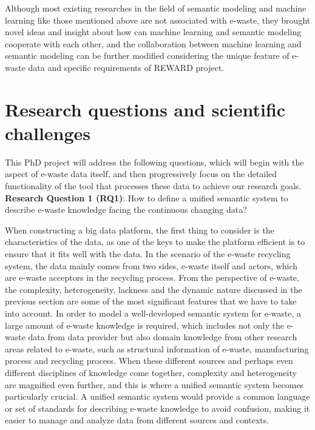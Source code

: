 \documentclass{article}
\numberwithin{equation}{section}
\begin{document}
Although most existing researches in the field of semantic modeling and machine learning like those mentioned above are not associated with e-waste, they brought novel ideas and insight about how can machine learning and semantic modeling cooperate with each other, and the collaboration between machine learning and semantic modeling can be further modified considering the unique feature of e-waste data and specific requirements of REWARD project. 

\section{Research questions and scientific challenges}
This PhD project will address the following questions, which will begin with the aspect of e-waste data itself, and then progressively focus on the detailed functionality of the tool that processes these data to achieve our research goals. \\

\textbf{Research Question 1 (RQ1)}: How to define a unified semantic system to describe e-waste knowledge facing the continuous changing data?

When constructing a big data platform, the first thing to consider is the characteristics of the data, as one of the keys to make the platform efficient is to ensure that it fits well with the data. In the scenario of the e-waste recycling system, the data mainly comes from two sides, e-waste itself and actors, which are e-waste acceptors in the recycling process. From the perspective of e-waste, the complexity, heterogeneity, lackness and the dynamic nature discussed in the previous section are some of the most significant features that we have to take into account. In order to model a well-developed semantic system for e-waste, a large amount of e-waste knowledge is required, which includes not only the e-waste data from data provider but also domain knowledge from other research areas related to e-waste, such as structural information of e-waste, manufacturing process and recycling process. When these different sources and perhaps even different disciplines of knowledge come together, complexity and heterogeneity are magnified even further, and this is where a unified semantic system becomes particularly crucial. A unified semantic system would provide a common language or set of standards for describing e-waste knowledge to avoid confusion, making it easier to manage and analyze data from different sources and contexts.
\end{document}
